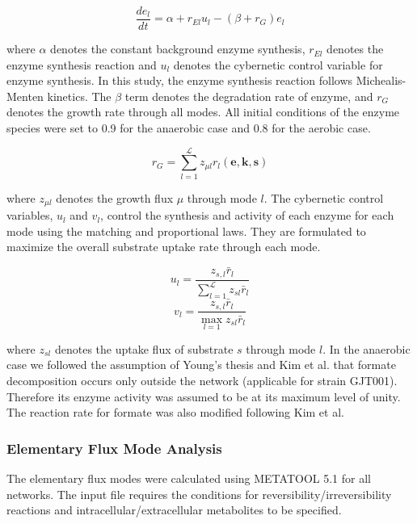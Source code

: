 \documentclass[10pt,twocolumn,twoside,final]{IEEEtran}
\begin{document}
\begin{equation}
	\frac{de_{l}}{dt}  = \alpha + r_{El}u_{l} - \left(\beta+r_{G}\right)e_{l}
\end{equation}

where $\alpha$ denotes the constant background enzyme synthesis, $r_{El}$ denotes the enzyme synthesis reaction and $u_{l}$ denotes the cybernetic control variable for enzyme synthesis. In this study, the enzyme synthesis reaction follows Michealis-Menten kinetics. The $\beta$ term denotes the degradation rate of enzyme, and $r_{G}$ denotes the growth rate through all modes. All initial conditions of the enzyme species were set to 0.9 for the anaerobic case and 0.8 for the aerobic case. 

\begin{equation}
	r_{G}  = \sum_{l = 1}^{\mathcal{L}}z_{\mu l}r_{l}\left(\mathbf{e},\mathbf{k},\mathbf{s}\right)
\end{equation}

where $z_{\mu l}$ denotes the growth flux $\mu$ through mode $l$. 
The cybernetic control variables, $u_{l}$ and $v_{l}$, control the synthesis and activity of each enzyme for each mode using the matching and proportional laws\cite{2007_young_ramkrishna_BiotechProg}. 
They are formulated to maximize the overall substrate uptake rate through each mode. 

\begin{equation}
	u_{l}  = \frac{z_{s,l}\bar{r}_{l}}{\sum_{l = 1}^{\mathcal{L}}z_{sl}\bar{r}_{l}} 
\end{equation}
\begin{equation}
	v_{l} = \frac{z_{s,l}\bar{r}_{l}}{\max_{l=1} z_{sl}\bar{r}_{l}}
\end{equation}

where $z_{sl}$ denotes the uptake flux of substrate $s$ through mode $l$. 
In the anaerobic case we followed the assumption of Young's thesis\cite{2005_Young} and Kim et al.\cite{2008_kim_varner_ramkrishna_BiotechProg} that formate decomposition occurs only outside the network (applicable for strain GJT001). 
Therefore its enzyme activity was assumed to be at its maximum level of unity. 
The reaction rate for formate was also modified following Kim et al.\cite{2008_kim_varner_ramkrishna_BiotechProg}  

\subsubsection*{Elementary Flux Mode Analysis}
The elementary flux modes were calculated using METATOOL 5.1\cite{2006_vonKamp_Metatool} for all networks. 
The input file requires the conditions for reversibility/irreversibility reactions and intracellular/extracellular metabolites to be specified. 
\end{document}
